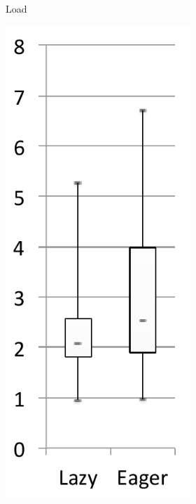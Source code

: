 \documentclass[sigplan,10pt,screen]{acmart}\settopmatter{printfolios=true,printccs=true,printacmref=true}
\begin{document}
\begin{figure}[bth]
\begin{subfigure}[b]{.48\textwidth}
\begin{subfigure}[b]{.24\textwidth}
    		\caption{Load}
       	\end{subfigure}%
       	\begin{subfigure}[b]{.24\textwidth}
    		\includegraphics[width=\linewidth]{figures/wildflyExp} 

\end{subfigure}
\end{subfigure}
\end{figure}
\end{document}
